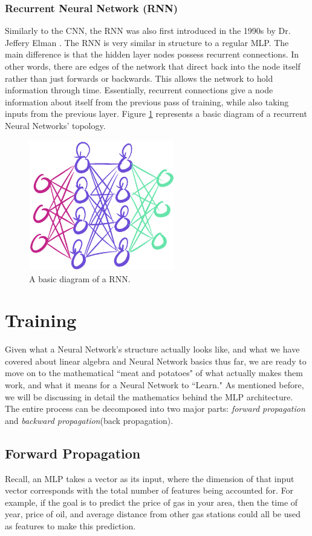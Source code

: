\documentclass[12pt]{report}
\begin{document}
\subsubsection{Recurrent Neural Network (RNN)}
Similarly to the CNN, the RNN was also first introduced in the 1990s by Dr. Jeffery Elman \cite{elman1990finding}.
The RNN is very similar in structure to a regular MLP. The main difference is that the hidden layer nodes possess recurrent connections.
In other words, there are edges of the network that direct back into the node itself rather than just forwards or backwards. This allows the network to hold information through time. Essentially, recurrent connections give a node information about itself from the previous pass of training, while also taking inputs from the previous layer. Figure \ref{rnn} represents a basic diagram of a recurrent Neural Networks' topology.
\begin{figure}[hbt!]
    \centering
    \includegraphics[width=2.5in]{figures/rnn.PNG}
    \caption{A basic diagram of a RNN.}
    \label{rnn}
\end{figure}

\section{Training}
\label{training}
Given what a Neural Network's structure actually looks like, and what we have covered about linear algebra and Neural Network basics thus far, we are ready to move on to the mathematical ``meat and potatoes" of what actually makes them work, and what it means for a Neural Network to ``Learn."
As mentioned before, we will be discussing in detail the mathematics behind the MLP architecture.
The entire process can be decomposed into two major parts: \emph{forward propagation} and \emph{backward propagation}(back propagation).

\subsection{Forward Propagation}
Recall, an MLP takes a vector as its input, where the dimension of that input vector corresponds with the total number of features being accounted for.
For example, if the goal is to predict the price of gas in your area, then the time of year, price of oil, and average distance from other gas stations could all be used as features to make this prediction.
\end{document}
